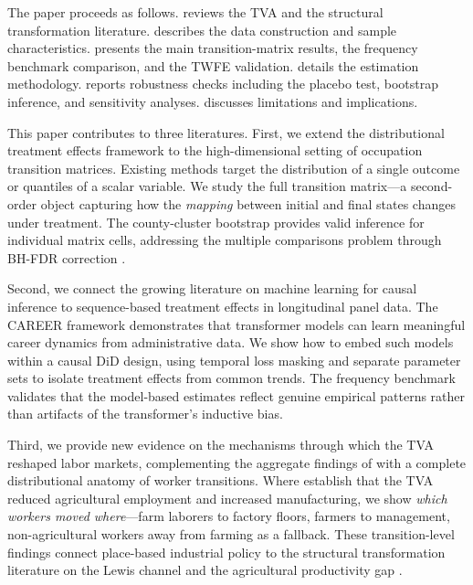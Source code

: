 \documentclass[12pt]{article}
\begin{document}
The paper proceeds as follows.  reviews the TVA and the structural transformation literature.  describes the data construction and sample characteristics.  presents the main transition-matrix results, the frequency benchmark comparison, and the TWFE validation.  details the estimation methodology.  reports robustness checks including the placebo test, bootstrap inference, and sensitivity analyses.  discusses limitations and implications.

This paper contributes to three literatures. First, we extend the distributional treatment effects framework \citep{athey2006, callaway2019, firpo2009} to the high-dimensional setting of occupation transition matrices. Existing methods target the distribution of a single outcome or quantiles of a scalar variable. We study the full transition matrix---a second-order object capturing how the \textit{mapping} between initial and final states changes under treatment. The county-cluster bootstrap provides valid inference for individual matrix cells, addressing the multiple comparisons problem through BH-FDR correction \citep{benjamini1995}.

Second, we connect the growing literature on machine learning for causal inference \citep{athey2019} to sequence-based treatment effects in longitudinal panel data. The CAREER framework \citep{vafa2022} demonstrates that transformer models can learn meaningful career dynamics from administrative data. We show how to embed such models within a causal DiD design, using temporal loss masking and separate parameter sets to isolate treatment effects from common trends. The frequency benchmark validates that the model-based estimates reflect genuine empirical patterns rather than artifacts of the transformer's inductive bias.

Third, we provide new evidence on the mechanisms through which the TVA reshaped labor markets, complementing the aggregate findings of \citet{kline2014} with a complete distributional anatomy of worker transitions. Where \citet{kline2014} establish that the TVA reduced agricultural employment and increased manufacturing, we show \textit{which workers moved where}---farm laborers to factory floors, farmers to management, non-agricultural workers away from farming as a fallback. These transition-level findings connect place-based industrial policy to the structural transformation literature on the Lewis channel \citep{lewis1954} and the agricultural productivity gap \citep{gollin2014}.
\end{document}
